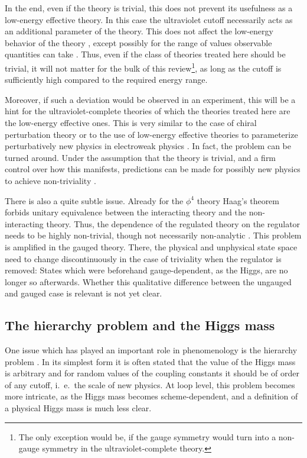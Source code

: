\documentclass[final,12pt]{article}
\newcommand*{\1}{1\!\!\!\bot}
\begin{document}
In the end, even if the theory is trivial, this does not prevent its usefulness as a low-energy effective theory. In this case the ultraviolet cutoff necessarily acts as an additional parameter of the theory. This does not affect the low-energy behavior of the theory \cite{Hasenfratz:1986za}, except possibly for the range of values observable quantities can take \cite{Eichhorn:2015kea}. Thus, even if the class of theories treated here should be trivial, it will not matter for the bulk of this review\footnote{The only exception would be, if the gauge symmetry would turn into a non-gauge symmetry in the ultraviolet-complete theory.}, as long as the cutoff is sufficiently high compared to the required energy range.

Moreover, if such a deviation would be observed in an experiment, this will be a hint for the ultraviolet-complete theories of which the theories treated here are the low-energy effective ones. This is very similar to the case of chiral perturbation theory \cite{BeiglboCk:2006lfa} or to the use of low-energy effective theories to parameterize perturbatively new physics in electroweak physics \cite{deFlorian:2016spz}. In fact, the problem can be turned around. Under the assumption that the theory is trivial, and a firm control over how this manifests, predictions can be made for possibly new physics to achieve non-triviality \cite{Bezrukov:2012sa,Eichhorn:2017ylw,Christiansen:2017cxa}.

There is also a quite subtle issue. Already for the $\phi^4$ theory Haag's theorem \cite{Haag:1992hx} forbids unitary equivalence between the interacting theory and the non-interacting theory. Thus, the dependence of the regulated theory on the regulator needs to be highly non-trivial, though not necessarily non-analytic \cite{Glimm:1987ng}. This problem is amplified in the gauged theory. There, the physical and unphysical state space need to change discontinuously in the case of triviality when the regulator is removed: States which were beforehand gauge-dependent, as the Higgs, are no longer so afterwards. Whether this qualitative difference between the ungauged and gauged case is relevant is not yet clear.

\subsection{The hierarchy problem and the Higgs mass}\label{ss:hierarchy}

One issue which has played an important role in phenomenology is the hierarchy problem \cite{Feng:2013pwa,Morrissey:2009tf}. In its simplest form it is often stated that the value of the Higgs mass is arbitrary and for random values of the coupling constants it should be of order of any cutoff, i.\ e.\ the scale of new physics. At loop level, this problem becomes more intricate, as the Higgs mass becomes scheme-dependent, and a definition of a physical Higgs mass is much less clear.
\end{document}
